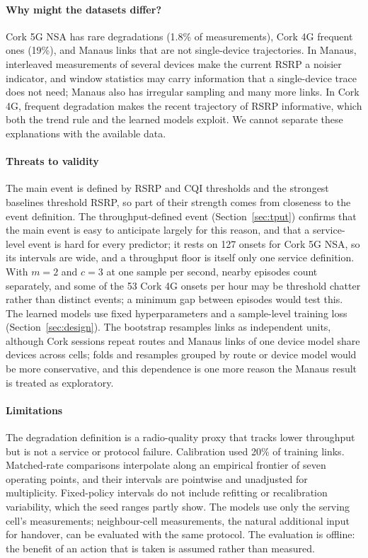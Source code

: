 \documentclass[preprint,review,12pt]{elsarticle}
\begin{document}
\paragraph{Why might the datasets differ?}
Cork 5G NSA has rare degradations (1.8\% of measurements), Cork 4G frequent ones (19\%), and
Manaus links that are not single-device trajectories. In Manaus, interleaved
measurements of several devices make the current RSRP a noisier indicator, and window
statistics may carry information that a single-device trace does not need; Manaus also
has irregular sampling and many more links. In Cork 4G, frequent degradation makes the
recent trajectory of RSRP informative, which both the trend rule and the learned models
exploit. We cannot separate these explanations with the available data.

\paragraph{Threats to validity}
The main event is defined by RSRP and CQI thresholds and the strongest baselines
threshold RSRP, so part of their strength comes from closeness to the event definition.
The throughput-defined event (Section~\ref{sec:tput}) confirms that the main event is
easy to anticipate largely for this reason, and that a service-level event is hard for
every predictor; it rests on 127 onsets for Cork 5G NSA, so its intervals are wide, and a
throughput floor is itself only one service definition. With $m=2$ and $c=3$ at one sample per second, nearby episodes count separately,
and some of the 53 Cork 4G onsets per hour may be threshold chatter rather than distinct
events; a minimum gap between episodes would test this. The learned models use fixed
hyperparameters and a sample-level training loss (Section~\ref{sec:design}). The
bootstrap resamples links as independent units, although Cork sessions repeat routes and
Manaus links of one device model share devices across cells; folds and resamples grouped
by route or device model would be more conservative, and this dependence is one more
reason the Manaus result is treated as exploratory.

\paragraph{Limitations}
The degradation definition is a radio-quality proxy that tracks lower throughput but is
not a service or protocol failure. Calibration used 20\% of training links. Matched-rate
comparisons interpolate along an empirical frontier of seven operating points, and their
intervals are pointwise and unadjusted for multiplicity. Fixed-policy intervals do not
include refitting or recalibration variability, which the seed ranges partly show. The
models use only the serving cell's measurements; neighbour-cell measurements, the
natural additional input for handover, can be evaluated with the same protocol. The evaluation is offline: the benefit
of an action that is taken is assumed rather than measured.
\end{document}
